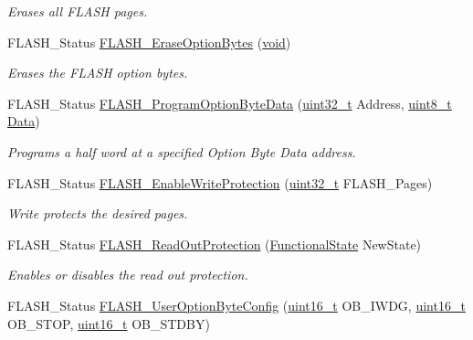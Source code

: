 \begin{DoxyCompactItemize}
\begin{DoxyCompactList}\small\item\em Erases all F\-L\-A\-S\-H pages. \end{DoxyCompactList}\item 
F\-L\-A\-S\-H\-\_\-\-Status \hyperlink{group___f_l_a_s_h___exported___functions_ga152768609e85d74a9d8474be8dc2874b}{F\-L\-A\-S\-H\-\_\-\-Erase\-Option\-Bytes} (\hyperlink{group___n_a_m_e_ga18028b8badbf1ea7e704ccac3c488e82}{void})
\begin{DoxyCompactList}\small\item\em Erases the F\-L\-A\-S\-H option bytes. \end{DoxyCompactList}\item 
F\-L\-A\-S\-H\-\_\-\-Status \hyperlink{group___f_l_a_s_h___exported___functions_ga1382ff9d4ded8a5c076fde4fff529d21}{F\-L\-A\-S\-H\-\_\-\-Program\-Option\-Byte\-Data} (\hyperlink{stdint_8h_a435d1572bf3f880d55459d9805097f62}{uint32\-\_\-t} Address, \hyperlink{stdint_8h_aba7bc1797add20fe3efdf37ced1182c5}{uint8\-\_\-t} \hyperlink{group___copter_control_b_l_ga6f3335509cc4943e20df66f72483910c}{Data})
\begin{DoxyCompactList}\small\item\em Programs a half word at a specified Option Byte Data address. \end{DoxyCompactList}\item 
F\-L\-A\-S\-H\-\_\-\-Status \hyperlink{group___f_l_a_s_h___exported___functions_gabad10c15e2d1ff1cb9e1083d08a9e763}{F\-L\-A\-S\-H\-\_\-\-Enable\-Write\-Protection} (\hyperlink{stdint_8h_a435d1572bf3f880d55459d9805097f62}{uint32\-\_\-t} F\-L\-A\-S\-H\-\_\-\-Pages)
\begin{DoxyCompactList}\small\item\em Write protects the desired pages. \end{DoxyCompactList}\item 
F\-L\-A\-S\-H\-\_\-\-Status \hyperlink{group___f_l_a_s_h___exported___functions_ga0b8d1a8277950c890bbc247bbeafb40f}{F\-L\-A\-S\-H\-\_\-\-Read\-Out\-Protection} (\hyperlink{group___exported__types_gac9a7e9a35d2513ec15c3b537aaa4fba1}{Functional\-State} New\-State)
\begin{DoxyCompactList}\small\item\em Enables or disables the read out protection. \end{DoxyCompactList}\item 
F\-L\-A\-S\-H\-\_\-\-Status \hyperlink{group___f_l_a_s_h___exported___functions_gaae1c493bb06c930ceb84dedfdb7325f6}{F\-L\-A\-S\-H\-\_\-\-User\-Option\-Byte\-Config} (\hyperlink{stdint_8h_a273cf69d639a59973b6019625df33e30}{uint16\-\_\-t} O\-B\-\_\-\-I\-W\-D\-G, \hyperlink{stdint_8h_a273cf69d639a59973b6019625df33e30}{uint16\-\_\-t} O\-B\-\_\-\-S\-T\-O\-P, \hyperlink{stdint_8h_a273cf69d639a59973b6019625df33e30}{uint16\-\_\-t} O\-B\-\_\-\-S\-T\-D\-B\-Y)

\end{DoxyCompactItemize}

